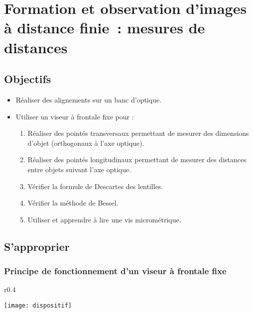 \documentclass[a4paper, 12pt, final, garamond]{book}
\begin{document}
\setcounter{chapter}{1}

\chapter{Formation et observation d'images \`a distance finie~: mesures de
distances}

\section{Objectifs}

\begin{itemize}
    \item Réaliser des alignements sur un banc d'optique.
    \item Utiliser un viseur à frontale fixe pour :
        \begin{enumerate}
            \item Réaliser des pointés transversaux permettant de mesurer des
                dimensions d'objet (orthogonaux à l'axe optique).
            \item Réaliser des pointés longitudinaux permettant de mesurer des
                distances entre objets suivant l'axe optique.
            \item Vérifier la formule de Descartes des lentilles.
            \item Vérifier la méthode de Bessel.
            \item Utiliser et apprendre à lire une vis micrométrique.
        \end{enumerate}
\end{itemize}

\section{S'approprier}

\subsection{Principe de fonctionnement d'un viseur à frontale fixe}

\begin{wrapfigure}[5]{r}{0.4\textwidth} 
    \vspace*{-40pt}
    \begin{center}
        \texttt{[image: dispositif]}
    \end{center}
\end{wrapfigure} 
\end{document}
